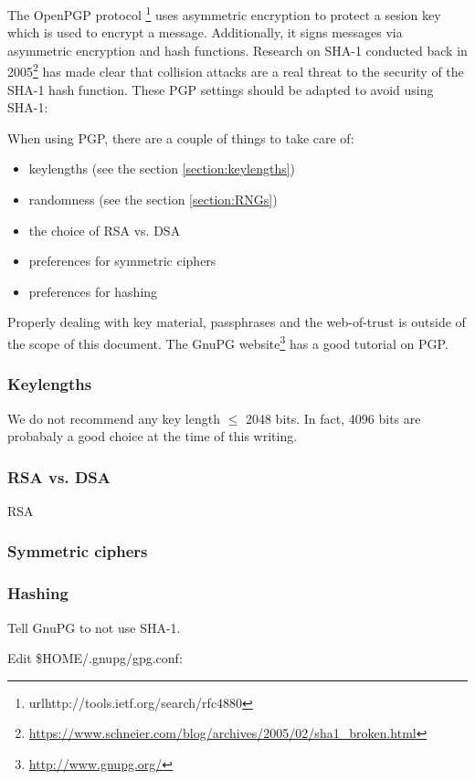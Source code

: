 
The OpenPGP protocol
\footnote{url{http://tools.ietf.org/search/rfc4880}}
 uses asymmetric encryption to protect a sesion key which is used to encrypt a message. Additionally, it signs messages via asymmetric encryption and hash functions. %
Research on SHA-1 conducted back in 2005\footnote{\url{https://www.schneier.com/blog/archives/2005/02/sha1\_broken.html}} has made clear that collision attacks are a real threat to the security of the SHA-1 hash function. These PGP settings should be adapted to avoid using SHA-1: 

When using PGP, there are a couple of things to take care of:
\begin{itemize}
\item keylengths (see the section \ref{section:keylengths})
\item randomness (see the section \ref{section:RNGs})
\item the choice of RSA vs. DSA 
\item preferences for symmetric ciphers
\item preferences for hashing
\end{itemize}

Properly dealing with key material, passphrases and the web-of-trust is outside of the scope of this document. The GnuPG website\footnote{\url{http://www.gnupg.org/}} has a good tutorial on PGP.

\subsubsection{Keylengths}
We do not recommend any key length $\le$ 2048 bits. In fact, 4096 bits are probabaly a good choice at the time of this writing.

\subsubsection{RSA vs. DSA}
RSA%

\subsubsection{Symmetric ciphers}


\subsubsection{Hashing}
Tell GnuPG to not use SHA-1.

Edit \$HOME/.gnupg/gpg.conf:

